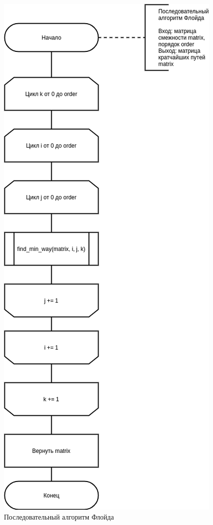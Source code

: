 \begin{figure}[H]
	\begin{center}
		\includegraphics[scale=0.6]{images/floyd.png}
	\end{center}
	\captionsetup{justification=centering}
	\caption{Последовательный алгоритм Флойда}
	\label{img:floyd}
\end{figure}


